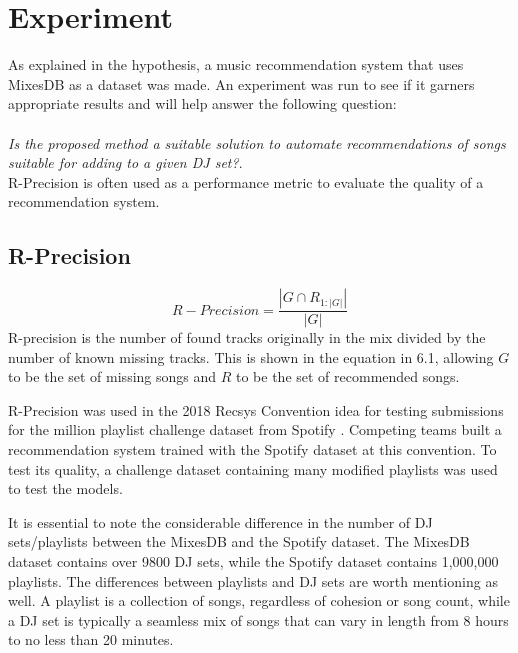 
\graphicspath{{Chapter5/}}


\chapter{Experiment}


As explained in the hypothesis, a music recommendation system that uses MixesDB as a dataset was made. An experiment was run to see if it garners appropriate results and will help answer the following question:
\\
\\
\textit{Is the proposed method a suitable solution to automate recommendations of songs suitable for adding to a given DJ set?}.
\\

R-Precision is often used as a performance metric to evaluate the quality of a recommendation system. 

\section{R-Precision}

\begin{equation}
	R-Precision = \frac{|G\cap R_{1:|G|}|}{|G|}
\end{equation}
R-precision is the number of found tracks originally in the mix divided by the number of known missing tracks. This is shown in the equation in 6.1, allowing $G$ to be the set of missing songs and $R$ to be the set of recommended songs.

R-Precision was used in the 2018 Recsys Convention idea for testing submissions for the million playlist challenge dataset from Spotify \citep{aicrowd_aicrowd_2023}. Competing teams built a recommendation system trained with the Spotify dataset at this convention. To test its quality, a challenge dataset containing many modified playlists was used to test the models.

It is essential to note the considerable difference in the number of DJ sets/playlists between the MixesDB and the Spotify dataset. The MixesDB dataset contains over 9800 DJ sets, while the Spotify dataset contains 1,000,000 playlists. The differences between playlists and DJ sets are worth mentioning as well. A playlist is a collection of songs, regardless of cohesion or song count, while a DJ set is typically a seamless mix of songs that can vary in length from 8 hours to no less than 20 minutes.

